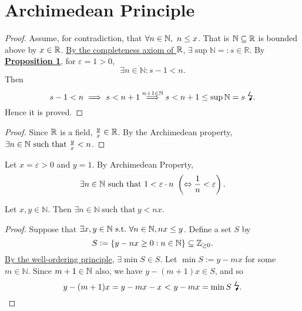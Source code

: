 \documentclass[11pt,openany]{article}
\begin{document}
\section{Archimedean Principle}
\begin{proof}
Assume, for contradiction, that $\forall n\in\mathbb{N},\ n\leq x$. That is $\mathbb{N}\subseteq\mathbb{R}$ is bounded above by $x\in\mathbb{R}$. \underline{By the completeness axiom of $\mathbb{R}$}, $\exists\sup\mathbb{N}=:s\in\mathbb{R}$. By \hyperlink{pro1}{\textbf{Proposition 1}}, for $\varepsilon=1>0$, \[
\exists n\in\mathbb{N}:s-1<n.
\] Then \[
s-1<n\implies s<n+1\overset{n+1\in\N}{\implies}s<n+1\leq\sup\N=s\ \text{\Large\lightning}.
\] Hence it is proved.
\end{proof}
\vfill
{}
\begin{proof}
	Since $\mathbb{R}$ is a field, $\frac{y}{x}\in\mathbb{R}$. By the Archimedean property, $
	\exists n\in\N\ \text{such that}\ \frac{y}{x}<n$.
\end{proof}
\begin{remark*}
Let $x=\varepsilon>0$ and $y=1$. By Archimedean Property, \[
\exists n\in\N\ \text{such that}\ 1<\varepsilon\cdot n\ \left(\Leftrightarrow \frac{1}{n}<\varepsilon\right).
\]
\end{remark*}
\vfill
\begin{note}
	Let $x,y\in\mathbb{N}$. Then $
	\exists n\in\mathbb{N}\ \text{such that}\ y< nx$.
	\begin{proof}
	\textcolor{gray!50}{Suppose that $
	\exists x,y\in\mathbb{N}\ \text{s.t.}\ \forall n\in\mathbb{N}, nx\leq y$. Define a set $S$ by \[
	S:=\set{y-nx\geq 0:n\in\mathbb{N}}\subseteq\mathbb{Z}_{\geq 0}.
	\] \underline{By the well-ordering principle}, $\exists\min S\in S$. Let $\min S:=y-mx$ for some $m\in\mathbb{N}$. Since $m+1\in\mathbb{N}$ also, we have  $y-(m+1)x\in S$, and so \[
	{y-(m+1)x}=y-mx-x\ {<}\ y-mx={\min S}\ \text{\Large\lightning}.
	\]}
	\end{proof}	
\end{note}
\end{document}

